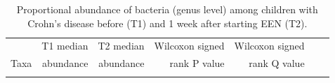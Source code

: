 \newpage
{\footnotesize
	\renewcommand{\arraystretch}{0.7} \setlength{\tabcolsep}{3pt}
	\begin{longtable}{ | l | r | r | r | r | r | r  | }
		\caption[ Proportional abundance of bacteria (genus level) among children with Crohn's disease before (T1) and 1 week after starting EEN (T2) ]{ Proportional abundance of bacteria (genus level) among children with Crohn's disease before (T1) and 1 week after starting EEN (T2).	} 
		\label{TS8} \\
		
		\hline 
		& T1  median& T2  median & Wilcoxon signed  & Wilcoxon signed \\ 
		Taxa & abundance & abundance & rank P value & rank Q value \\
		\hline 
		\endfirsthead
		
		
		\endfoot
		
		\hline 
		\endlastfoot
		

\end{longtable}}
